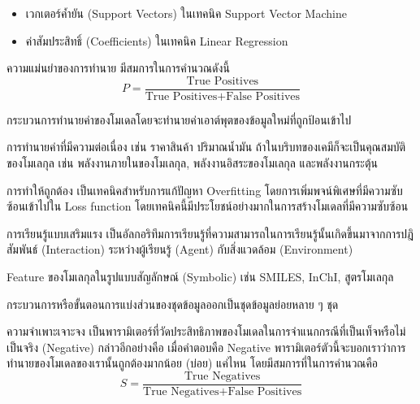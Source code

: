 \begin{description}[style=nextline]
\begin{itemize}
        \item เวกเตอร์ค้ำยัน (Support Vectors) ในเทคนิค Support Vector Machine
        
        \item ค่าสัมประสิทธิ์ (Coefficients) ในเทคนิค Linear Regression
    \end{itemize}

    \item[Precision] ความแม่นยำของการทำนาย มีสมการในการคำนวณดังนี้
    \begin{equation}\label{eq:precision}
        P = \frac{\text{True Positives}}{\text{True Positives} + \text{False Positives}}
    \end{equation}

    \item[Prediction] กระบวนการทำนายค่าของโมเดลโดยจะทำนายค่าเอาต์พุตของข้อมูลใหม่ที่ถูกป้อนเข้าไป

    \item[Regression]  การทำนายค่าที่มีความต่อเนื่อง เช่น ราคาสินค้า ปริมาณน้ำมัน ถ้าในบริบทของเคมีก็จะเป็นคุณสมบัติของโมเลกุล 
    เช่น พลังงานภายในของโมเลกุล, พลังงานอิสระของโมเลกุล และพลังงานกระตุ้น

    \item[Regularization] การทำให้ถูกต้อง เป็นเทคนิคสำหรับการแก้ปัญหา Overfitting โดยการเพิ่มพจน์พิเศษที่มีความซับซ้อนเข้าไปใน 
    Loss function โดยเทคนิคนี้มีประโยชน์อย่างมากในการสร้างโมเดลที่มีความซับซ้อน

    \item[Reinforment Learning] การเรียนรู้แบบเสริมแรง เป็นอัลกอริทึมการเรียนรู้ที่ความสามารถในการเรียนรู้นั้นเกิดขึ้นมาจากการปฎิสัมพันธ์ 
    (Interaction) ระหว่างผู้เรียนรู้ (Agent) กับสิ่งแวดล้อม (Environment)

    \item[Representation] Feature ของโมเลกุลในรูปแบบสัญลักษณ์ (Symbolic) เช่น SMILES, InChI, สูตรโมเลกุล

    \item[Segmentation] กระบวนการหรือขั้นตอนการแบ่งส่วนของชุดข้อมูลออกเป็นชุดข้อมูลย่อยหลาย ๆ ชุด

    \item[Specificity] ความจำเพาะเจาะจง เป็นพารามิเตอร์ที่วัดประสิทธิภาพของโมเดลในการจำแนกกรณีที่เป็นเท็จหรือไม่เป็นจริง (Negative)
    กล่าวอีกอย่างคือ เมื่อคำตอบคือ Negative พารามิเตอร์ตัวนี้จะบอกเราว่าการทำนายของโมเดลของเรานั้นถูกต้องมากน้อย (บ่อย) แค่ไหน
    โดยมีสมการที่ในการคำนวณคือ
    \begin{equation}\label{eq:specficity}
        S = \frac{\text{True Negatives}}{\text{True Negatives} + \text{False Positives}}
    \end{equation}


\end{description}
